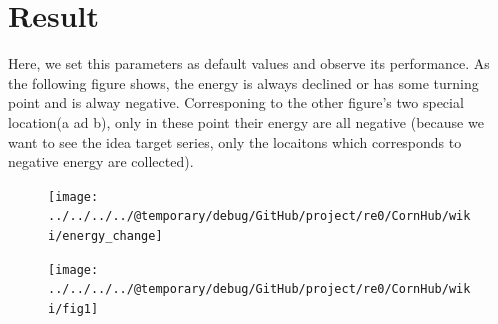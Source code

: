 \documentclass[a4paper,10pt]{article}
\begin{document}
	\section{Result}
	Here, we set this parameters as default values and observe its performance. As the following figure shows, the energy is always declined or has some turning point and is alway negative. Corresponing to the other figure's two special location(a ad b), only in these point their energy are all negative (because we want to see the idea target series, only the locaitons which corresponds to negative energy are collected).
	\begin{figure}
		\centering
		\texttt{[image: ../../../../@temporary/debug/GitHub/project/re0/CornHub/wiki/energy\_change]}
		\caption[energy change]{}
		\caption{}
		\label{fig:energy change}
	\end{figure}
	\begin{figure}
		\centering
		\texttt{[image: ../../../../@temporary/debug/GitHub/project/re0/CornHub/wiki/fig1]}
		\caption[cleavage possibility]{}
		\caption{}
		\label{fig:fig1}
	\end{figure}
	  
\end{document}
